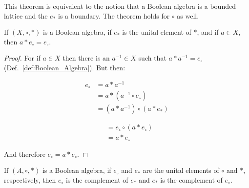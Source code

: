     This theorem is equivalent to the notion that a Boolean algebra is a
    bounded lattice and the $e_{*}$ is a boundary. The
    theorem holds for $\circ$ as well.
    \begin{theorem}
        If $(X,\circ,*)$ is a Boolean algebra, if $e_{*}$ is the unital
        element of $*$, and if $a\in{X}$, then $a*{e}_{\circ}=e_{\circ}$.
    \end{theorem}
    \begin{proof}
        For if $a\in{X}$ then there is an $a^{\minus{1}}\in{X}$ such that
        $a*{a}^{\minus{1}}=e_{\circ}$ (Def.~\ref{def:Boolean_Algebra}).
        But then:
        \par\vspace{-2.5ex}
        \begin{minipage}[t]{0.51\textwidth}
            \centering
            \begin{align}
                e_{\circ}&=a*{a}^{\minus{1}}
                \tag{Complement}\\
                &=a*(a^{\minus{1}}\circ{e}_{\circ})
                \tag{Identity}\\
                &=(a*a^{\minus{1}})\circ(a*e_{*})
                \tag{Distributivity}
            \end{align}
        \end{minipage}
        \hfill
        \begin{minipage}[t]{0.47\textwidth}
            \centering
            \begin{align}
                &=e_{\circ}\circ(a*e_{\circ})
                \tag{Complement}\\
                &=a*e_{\circ}
                \tag{Identity}
            \end{align}
        \end{minipage}
        \par\vspace{2.5ex}
        And therefore $e_{\circ}=a*e_{\circ}$.
    \end{proof}
    \begin{theorem}
        If $(A,\circ,*)$ is a Boolean algebra, if $e_{\circ}$ and $e_{*}$
        are the unital elements of $\circ$ and $*$, respectively, then
        $e_{\circ}$ is the complement of $e_{*}$ and $e_{*}$ is the
        complement of $e_{\circ}$.
    \end{theorem}

